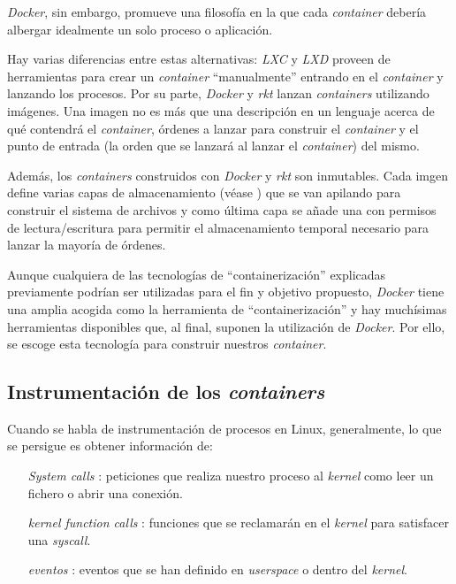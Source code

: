 \emph{Docker}, sin embargo, promueve una filosofía en la que cada \emph{container} debería albergar idealmente un solo proceso o aplicación.

Hay varias diferencias entre estas alternativas: \emph{LXC} y \emph{LXD} proveen de herramientas para crear un \emph{container} ``manualmente'' entrando en el \emph{container} y lanzando los procesos. Por su parte, \emph{Docker} y \emph{rkt}
lanzan \emph{containers} utilizando imágenes. Una imagen no es más que una descripción en un lenguaje acerca de qué contendrá el \emph{container}, órdenes a lanzar para construir el \emph{container} y el punto de entrada (la orden que se lanzará al lanzar el \emph{container}) del mismo.

Además, los \emph{containers} construidos con \emph{Docker} y \emph{rkt} son inmutables. Cada imgen define varias capas de almacenamiento (véase \cite{docker-storage}) que se van apilando
para construir el sistema de archivos y como última capa se añade una con permisos de lectura/escritura para permitir el almacenamiento temporal necesario para lanzar
la mayoría de órdenes.

Aunque cualquiera de las tecnologías de ``containerización'' explicadas previamente podrían ser utilizadas para el fin y objetivo propuesto, \emph{Docker} tiene una amplia acogida como la herramienta de ``containerización''
y hay muchísimas herramientas disponibles que, al final, suponen la utilización de \emph{Docker}. Por ello, se escoge esta tecnología para construir nuestros \emph{container}.

\subsection{Instrumentación de los \emph{containers}}
\label{subsec:instrumentacion-containers}

Cuando se habla de instrumentación de procesos en Linux, generalmente, lo que se persigue es obtener información de:
\begin{enumerate}
    \item[\emph{System calls}]: peticiones que realiza nuestro proceso al \emph{kernel} como leer un fichero o abrir una conexión.
    \item[\emph{kernel function calls}]: funciones que se reclamarán en el \emph{kernel} para satisfacer una \emph{syscall}.
    \item[\emph{eventos}]: eventos que se han definido en \emph{userspace} o dentro del \emph{kernel}.
\end{enumerate}

